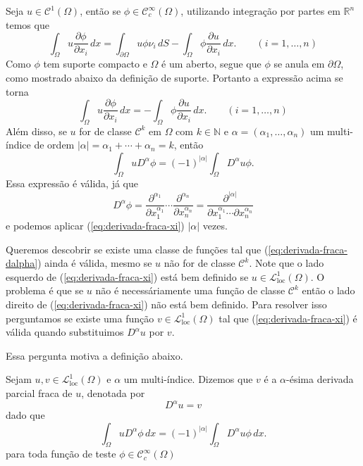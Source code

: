 \documentclass[a4paper, 11pt]{book}
\theoremstyle{definition}
\newcommand{\bN}{\mathbb{N}}
\newcommand{\bR}{\mathbb{R}}
\newcommand{\cC}{\mathcal{C}}
\newcommand{\cL}{\mathcal{L}}
\begin{document}
Seja $u \in \cC^1(\Omega)$, então se $\phi \in \cC^\infty_c(\Omega)$, utilizando integração por partes em $\bR^n$ temos que
\[
    \int_\Omega u \dfrac{\partial \phi}{\partial x_i} \,dx = \int_{\partial\Omega} u\phi \nu_i \, dS- \int_\Omega \phi \dfrac{\partial u}{\partial x_i} \,dx. \qquad (i = 1,\dots,n)
\]
Como $\phi$ tem suporte compacto e $\Omega$ é um aberto, segue que $\phi$ se anula em $\partial\Omega$, como mostrado abaixo da definição de suporte. Portanto a expressão acima se torna
\begin{equation} \label{eq:derivada-fraca-xi}
    \int_\Omega u \dfrac{\partial \phi}{\partial x_i} \,dx = - \int_\Omega \phi \dfrac{\partial u}{\partial x_i} \,dx. \qquad (i = 1,\dots,n)
\end{equation}
Além disso, se $u$ for de classe $\cC^k$ em $\Omega$ com $k \in \bN$ e $\alpha = (\alpha_1,\dots,\alpha_n)$ um multi-índice de ordem $|\alpha| = \alpha_1 + \cdots + \alpha_n = k$, então
\begin{equation} \label{eq:derivada-fraca-dalpha}
    \int_\Omega u D^\alpha \phi = (-1)^{|\alpha|} \int_\Omega D^\alpha u \phi.
\end{equation}
Essa expressão é válida, já que
\[
    D^\alpha \phi = \dfrac{\partial^{\alpha_1} }{\partial x_1^{\alpha_1}} \cdots \dfrac{\partial^{\alpha_n} }{\partial x_n^{\alpha_n}} = \dfrac{\partial^{|\alpha|} }{\partial x_1^{\alpha_1} \cdots \partial x_n^{\alpha_n}}
\]
e podemos aplicar (\ref{eq:derivada-fraca-xi}) $|\alpha|$ vezes.

Queremos descobrir se existe uma classe de funções tal que (\ref{eq:derivada-fraca-dalpha}) ainda é válida, mesmo se $u$ não for de classe $\cC ^k$. Note que o lado esquerdo de (\ref{eq:derivada-fraca-xi}) está bem definido se $u \in \cL^1_{\mathrm{loc}}(\Omega)$.
O problema é que se $u$ não é necessáriamente uma função de classe $\cC^k$ então o lado direito de (\ref{eq:derivada-fraca-xi}) não está bem definido. Para resolver isso perguntamos se existe uma função $v \in \cL^1_{\mathrm{loc}}(\Omega)$ tal que (\ref{eq:derivada-fraca-xi}) é válida quando substituimos $D^\alpha u$ por $v$.

Essa pergunta motiva a definição abaixo.

\begin{dbox}
    Sejam $u,v \in \cL^1_{\mathrm{loc}}(\Omega)$ e $\alpha$ um multi-índice. Dizemos que $v$ é a $\alpha$-ésima derivada parcial fraca de $u$, denotada por
    \[
        D^\alpha u = v
    \]
    dado que
    \begin{equation} \label{eq:derivada-fraca}
        \int_\Omega u D^\alpha \phi \,dx = (-1)^{|\alpha|} \int_\Omega D^\alpha u \phi \,dx.
    \end{equation}
    para toda função de teste $\phi \in \cC ^\infty_c(\Omega)$
\end{dbox}
\end{document}
